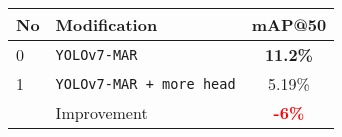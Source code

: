   \begin{tabular}{ l l c }
    \toprule[1.5pt]
    No & Modification                                &mAP@50 \\
    \midrule
    0  & \texttt{YOLOv7-MAR}                        & \textbf{11.2\%}\\
    1  & \texttt{YOLOv7-MAR + more head}            & 5.19\%\\
    \midrule
       & Improvement                                & \textbf{\textcolor{red}{-6\%}}\\
    \bottomrule[1.5pt]
  \end{tabular}